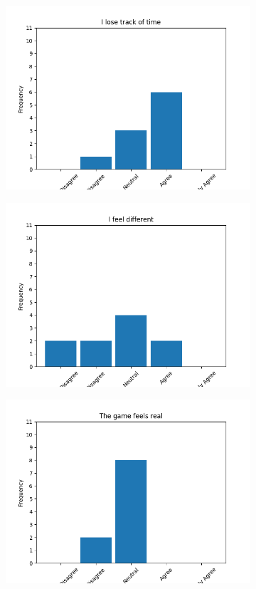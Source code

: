 \documentclass{article}
\begin{document}
\begin{figure}[!ht]
\begin{subfigure}{.5\textwidth}
    \includegraphics[width=\textwidth]{images/questions/2}
\end{subfigure}%
\begin{subfigure}{.5\textwidth}
    \centering
    \includegraphics[width=\textwidth]{images/questions/3}
\end{subfigure}
\begin{subfigure}{.5\textwidth}
    \centering
    \includegraphics[width=\textwidth]{images/questions/4}

\end{subfigure}
\end{figure}
\end{document}
